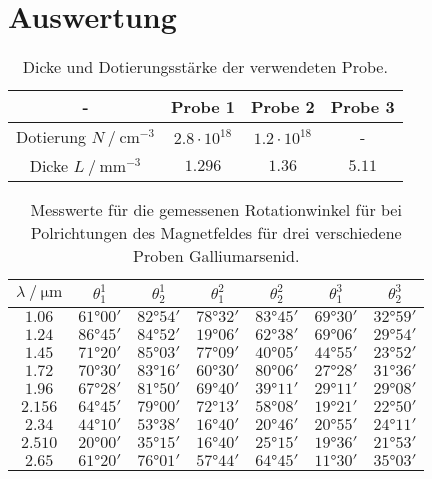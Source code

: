 \section{Auswertung}
\label{sec:auswertung}

\begin{table}[H]
    \centering
    \caption{Dicke und Dotierungsstärke der verwendeten Probe.}
    \label{tab:Probeneigenschaften}
    \begin{tabular}{c c c c}
    \toprule
      {-} & {Probe 1} & {Probe 2} & {Probe 3} \\
    \midrule
          {Dotierung $N \mathbin{/} \unit{\centi\meter^{-3}}$}  &  $2.8 \cdot 10^{18}$ & $1.2 \cdot 10^{18}$ &   {-}    \\    
          {Dicke     $L \mathbin{/} \unit{\milli\meter^{-3}}$}  &  $1.296$             & $1.36$              &   $ 5.11$\\    
    \bottomrule
    \end{tabular}
\end{table}



\begin{table}[H]
    \centering
    \caption{Messwerte für die gemessenen Rotationwinkel für bei Polrichtungen des Magnetfeldes für drei verschiedene Proben Galliumarsenid.}
    \label{tab:Winkeldaten}
    \begin{tabular}{S[table-format=1.3] c c c c c c}
    \toprule
      {$\lambda \mathbin{/} \unit{\micro\meter}$ } & {$\theta^1_1$} & {$\theta^1_2$} & {$\theta^2_1$} & {$\theta^2_2$} & {$\theta^3_1$} & {$\theta^3_2$} \\
    \midrule
    {$1.06$}    & $\ang{61;00}$&   $\ang{82;54}$&   $\ang{78;32}$&   $\ang{83;45}$&   $\ang{69;30}$&  $\ang{32;59}$ \\
    {$1.24$}    & $\ang{86;45}$&   $\ang{84;52}$&   $\ang{19;06}$&   $\ang{62;38}$&   $\ang{69;06}$&  $\ang{29;54}$ \\
    {$1.45$}    & $\ang{71;20}$&   $\ang{85;03}$&   $\ang{77;09}$&   $\ang{40;05}$&   $\ang{44;55}$&  $\ang{23;52}$ \\
    {$1.72$}    & $\ang{70;30}$&   $\ang{83;16}$&   $\ang{60;30}$&   $\ang{80;06}$&   $\ang{27;28}$&  $\ang{31;36}$ \\
    {$1.96$}    & $\ang{67;28}$&   $\ang{81;50}$&   $\ang{69;40}$&   $\ang{39;11}$&   $\ang{29;11}$&  $\ang{29;08}$ \\
    {$2.156$}   & $\ang{64;45}$&   $\ang{79;00}$&   $\ang{72;13}$&   $\ang{58;08}$&   $\ang{19;21}$&  $\ang{22;50}$ \\
    {$2.34$}    & $\ang{44;10}$&   $\ang{53;38}$&   $\ang{16;40}$&   $\ang{20;46}$&   $\ang{20;55}$&  $\ang{24;11}$ \\
    {$2.510$}   & $\ang{20;00}$&   $\ang{35;15}$&   $\ang{16;40}$&   $\ang{25;15}$&   $\ang{19;36}$&  $\ang{21;53}$ \\
    {$2.65$}    & $\ang{61;20}$&   $\ang{76;01}$&   $\ang{57;44}$&   $\ang{64;45}$&   $\ang{11;30}$&  $\ang{35;03}$ \\
    \bottomrule
    \end{tabular}
\end{table}
